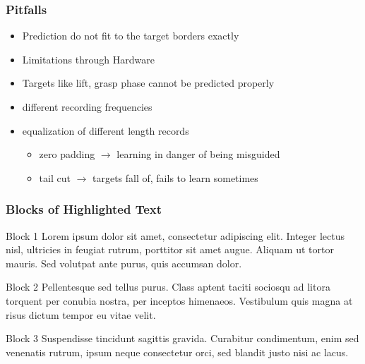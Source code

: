 \documentclass{beamer}
\begin{document}
\begin{frame}
	\frametitle{Pitfalls}
	\begin{itemize}
		\item Prediction do not fit to the target borders exactly
		\item Limitations through Hardware
		\item Targets like lift, grasp phase cannot be predicted properly
        \item different recording frequencies
        \item equalization of different length records
        \begin{itemize}
            \item zero padding $\rightarrow$ learning in danger of being misguided
            \item tail cut $\rightarrow$ targets fall of, fails to learn sometimes
        \end{itemize}
	\end{itemize}
\end{frame}


\begin{frame}
\frametitle{Blocks of Highlighted Text}
\begin{block}{Block 1}
Lorem ipsum dolor sit amet, consectetur adipiscing elit. Integer lectus nisl, ultricies in feugiat rutrum, porttitor sit amet augue. Aliquam ut tortor mauris. Sed volutpat ante purus, quis accumsan dolor.
\end{block}

\begin{block}{Block 2}
Pellentesque sed tellus purus. Class aptent taciti sociosqu ad litora torquent per conubia nostra, per inceptos himenaeos. Vestibulum quis magna at risus dictum tempor eu vitae velit.
\end{block}

\begin{block}{Block 3}
Suspendisse tincidunt sagittis gravida. Curabitur condimentum, enim sed venenatis rutrum, ipsum neque consectetur orci, sed blandit justo nisi ac lacus.
\end{block}
\end{frame}

\end{document}
